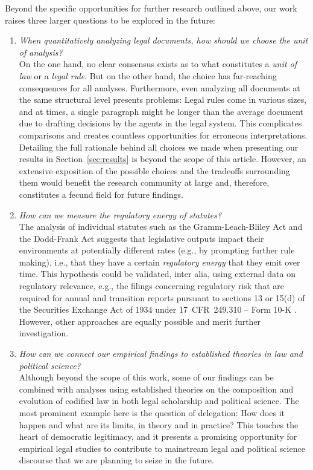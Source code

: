 \documentclass[utf8,sort&compress,table,hidelinks]{frontiersFPHY} %
\begin{document}
Beyond the specific opportunities for further research outlined above, 
our work raises three larger questions to be explored in the future:
\begin{enumerate}
	\item \emph{When quantitatively analyzing legal documents, how should we choose the unit of analysis?}\\
	On the one hand, no clear consensus exists as to what constitutes a \emph{unit of law} or a \emph{legal rule}. 
	But on the other hand, the choice has far-reaching consequences for all analyses.
	Furthermore, even analyzing all documents at the same structural level presents problems: 
	Legal rules come in various sizes, and at times, a single paragraph might be longer than the average document due to drafting decisions by the agents in the legal system.
	This complicates comparisons and creates countless opportunities for erroneous interpretations.
	Detailing the full rationale behind all choices we made when presenting our results in Section~\ref{sec:results} is beyond the scope of this article. 
	However, an extensive exposition of the possible choices and the tradeoffs surrounding them would benefit the research community at large and, therefore, constitutes a fecund field for future findings.
	\item \emph{How can we measure the \emph{regulatory energy} of statutes?}\\
	The analysis of individual statutes such as the Gramm-Leach-Bliley Act and the Dodd-Frank Act suggests that legislative outputs impact their environments at potentially different rates (e.g., by prompting further rule making), 
	i.e., that they have a certain \emph{regulatory energy} that they emit over time. 
	This hypothesis could be validated, inter alia, using external data on regulatory relevance, e.g., the filings concerning regulatory risk that are required for annual and transition reports pursuant to sections 13 or 15(d) of the Securities Exchange Act of $1934$ under 17~CFR~249.310 -- Form 10-K \cite{bommarito2017}. 
	However, other approaches are equally possible and merit further investigation.
	\item \emph{How can we connect our empirical findings to established theories in law and political science?}\\
	Although beyond the scope of this work, some of our findings can be combined with analyses using established theories on the composition and evolution of codified law in both legal scholarship and political science.
	The most prominent example here is the question of delegation: 
	How does it happen and what are its limits, in theory and in practice?
	This touches the heart of democratic legitimacy, and it presents a promising opportunity for empirical legal studies to contribute to mainstream legal and political science discourse that we are planning to seize in the future.
\end{enumerate}
\end{document}
